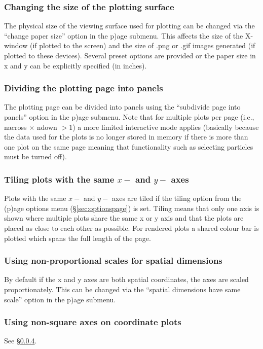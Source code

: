 \documentclass[a4paper,10pt]{article}
\begin{document}
\subsubsection{ Changing the size of the plotting surface}
\label{sec:papersize}
 The physical size of the viewing surface used for plotting can be changed via the ``change paper size'' option in the p)age submenu. This affects the size of the X-window (if plotted to the screen) and the size of .png or .gif images generated (if plotted to these devices). Several preset options are provided or the paper size in x and y can be explicitly specified (in inches).

\subsubsection{ Dividing the plotting page into panels}
\label{sec:nacrossndown}
The plotting page can be divided into panels using the ``subdivide page into panels'' option in the p)age submenu. Note that for multiple plots per page (i.e., nacross $\times$ ndown $> 1$) a more limited interactive mode applies (basically because the data used for the plots is no longer stored in memory if there is more than one plot on the same page meaning that functionality such as selecting particles must be turned off).

\subsubsection{ Tiling plots with the same $x-$ and $y-$ axes}
\label{sec:tiling}
 Plots with the same $x-$ and $y-$ axes are tiled if the tiling
option from the (p)age options menu (\S\ref{sec:optionspage}) is set. Tiling means that only one axis is shown where multiple plots share the same x or y axis and that the plots are placed as close to each other as possible. For rendered plots a shared colour bar is plotted which spans the full length of the page.

\subsubsection{ Using non-proportional scales for spatial dimensions}
\label{sec:squarexy}
 By default if the x and y axes are both spatial coordinates, the axes are scaled proportionately. This can be changed via the ``spatial dimensions have same scale'' option in the p)age submenu.

\subsubsection{ Using non-square axes on coordinate plots}
 See \S\ref{sec:squarexy}.
 
\end{document}
